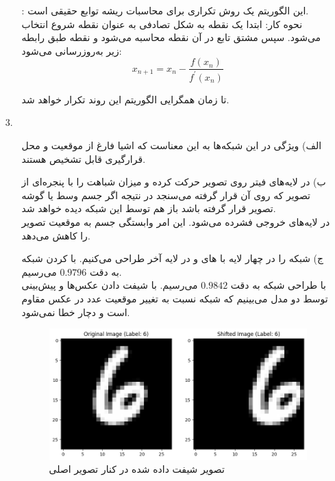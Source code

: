 \documentclass[a4paper]{article}
\begin{document}
\begin{itemize}
\begin{itemize}
: این الگوریتم یک روش تکراری برای محاسبات ریشه توابع حقیقی است.\\
نحوه کار: ابتدا یک نقطه به شکل تصادفی به عنوان نقطه شروع انتخاب می‌شود. سپس مشتق تابع در آن نقطه محاسبه می‌شود و نقطه طبق رابطه زیر به‌روزرسانی می‌شود:
\[
	x_{n+1} = x_n - \frac{f(x_n)}{f^{'}(x_n)}
\]

تا زمان همگرایی الگوریتم این روند تکرار خواهد شد.
	\end{itemize}
	\newpage
	\item[3.]‌
	\begin{itemize}
	\item[الف)]
ویژگی 
در این شبکه‌ها به این معناست که اشیا فارغ از موقعیت و محل قرارگیری قابل تشخیص هستند.
	\item[ب)]
	در لایه‌های
	فیتر روی تصویر حرکت کرده و میزان شباهت را با پنجره‌ای از تصویر که روی آن قرار گرفته می‌سنجد در نتیجه اگر جسم وسط یا گوشه تصویر قرار گرفته باشد باز هم توسط این شبکه‌ دیده خواهد شد.\\
	در لایه‌های
	خروجی فشرده می‌شود. این امر وابستگی جسم به موقعیت تصویر را کاهش می‌دهد.
	\item[ج)]
	شبکه 
	را در چهار لایه با 
	های 
	و
	در لایه آخر طراحی می‌کنیم. با 
	کردن شبکه به دقت $0.9796$ می‌رسیم.\\
	با طراحی شبکه
	به دقت $0.9842$
	می‌رسیم.
	با شیفت دادن عکس‌ها و پیش‌بینی توسط دو مدل می‌بینیم که شبکه 
	نسبت به تغییر موقعیت عدد در عکس مقاوم است و دچار خطا نمی‌شود.
	\begin{figure}[!h]
		\begin{center}
			\includegraphics[width= 10cm]{Pic8.png}
		\end{center}
		\caption{تصویر شیفت داده شده در کنار تصویر اصلی}
	\end{figure}
	\begin{figure}[!h]
		\begin{center}

\end{center}
\end{figure}
\end{itemize}
\end{itemize}
\end{document}
